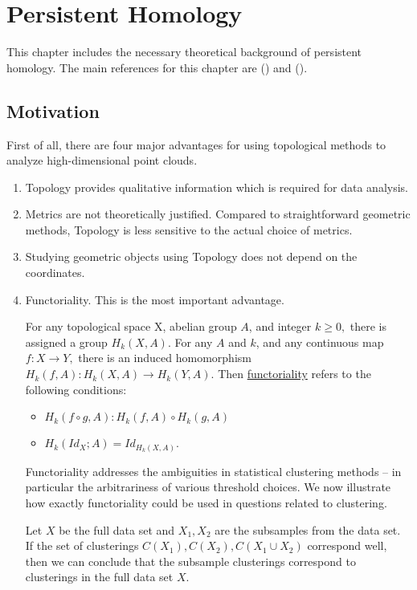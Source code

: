 \chapter{Persistent Homology} 
\label{chapter3-homology}

This chapter includes the necessary theoretical background of persistent homology. The main references for this chapter are (\cite{carlsson_topology_2009}) and (\cite{zomorodian_computing_nodate}).

\section{Motivation}

First of all, there are four major advantages for using topological methods to analyze high-dimensional point clouds.

\begin{enumerate}
	\item Topology provides qualitative information which is required for data analysis.
	
	\item Metrics are not theoretically justified. Compared to straightforward geometric methods, Topology is less sensitive to the actual choice of metrics. 
	
	\item Studying geometric objects using Topology does not depend on the coordinates. 
	
	\item Functoriality. This is the most important advantage.
	
	\begin{defn}[Functoriality]
	
		For any topological space X, abelian group $A$, and integer $k\geq 0,$ there is assigned a group $H_k(X,A).$ For any $A$ and $k$, and any continuous map $f: X \to Y,$ there is an induced homomorphism $H_k(f,A): H_k(X,A) \to H_k(Y,A).$ Then \underline{functoriality} refers to the following conditions:
		\begin{itemize}
			\item  $H_k(f\circ g,A): H_k(f,A) \circ H_k(g,A)$
			\item  $H_k(Id_{X};A) = Id_{H_k(X,A)}.$
		\end{itemize}
	\end{defn}
	Functoriality addresses the ambiguities in statistical clustering methods -- in particular the arbitrariness of various threshold choices. We now illustrate how exactly functoriality could be used in questions related to clustering. 
	
	Let $X$ be the full data set and $X_1,X_2$ are the subsamples from the data set. If the set of clusterings $C(X_1), C(X_2), C(X_1 \cup X_2)$ correspond well, then we can conclude that the subsample clusterings correspond to clusterings in the full data set $X$. 
\end{enumerate}

